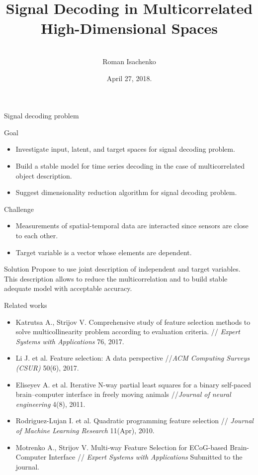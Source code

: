 \documentclass[9pt]{beamer}
\title[\hbox to 56mm{  \hfill\insertframenumber\,/\,\inserttotalframenumber}]
{\\ \vspace{1.5cm} Signal Decoding in Multicorrelated High-Dimensional Spaces}
\author[Roman Isachenko]{\\ 
	\vspace{.4cm}
	Roman Isachenko}
\institute[SkolTech]{Skoltech advisor: Maxim Fedorov \\ 
	\vspace{0.1cm}
	 MIPT advisor: Vadim Strijov
}
\date{April 27, 2018.}
\begin{document}
\begin{frame}
\titlepage
\end{frame}
\begin{frame}{Signal decoding problem}
	\begin{block}{Goal}
		\begin{itemize}
			\item Investigate input, latent, and target spaces for signal decoding problem.
			\item Build a stable model for time series decoding in the case of multicorrelated object description.
			\item Suggest dimensionality reduction algorithm for signal decoding problem.
		\end{itemize}
	\end{block}
	\begin{block}{Challenge}
		\begin{itemize}
			\item Measurements of spatial-temporal data are interacted since sensors are close to each other.
			\item Target variable is a vector whose elements are dependent.
		\end{itemize}
	\end{block}
	\begin{block}{Solution}
		Propose to use joint description of independent and target variables. This description allows to reduce the multicorrelation and to build stable adequate model with acceptable accuracy.
	\end{block}
\end{frame}
\begin{frame}{Related works}
	\begin{itemize}
		\item Katrutsa A., Strijov V. Comprehensive study of feature selection methods to solve multicollinearity problem according to evaluation criteria. // \textit{Expert Systems with Applications} 76, 2017.
		\vfill
		\item Li J. et al. Feature selection: A data perspective //\textit{ACM Computing Surveys (CSUR)} 50(6), 2017.
		\vfill
		\item Eliseyev A. et al. Iterative N-way partial least squares for a binary self-paced brain–computer interface in freely moving animals //\textit{Journal of neural engineering} 4(8), 2011.
		\vfill
		\item Rodriguez-Lujan I. et al. Quadratic programming feature selection // \textit{Journal of Machine Learning Research} 11(Apr), 2010.
		\vfill
		\item Motrenko A., Strijov V. Multi-way Feature Selection for ECoG-based Brain-Computer Interface // \textit{Expert Systems with Applications} Submitted to the journal.
	\end{itemize}
\end{frame}
\end{document}
